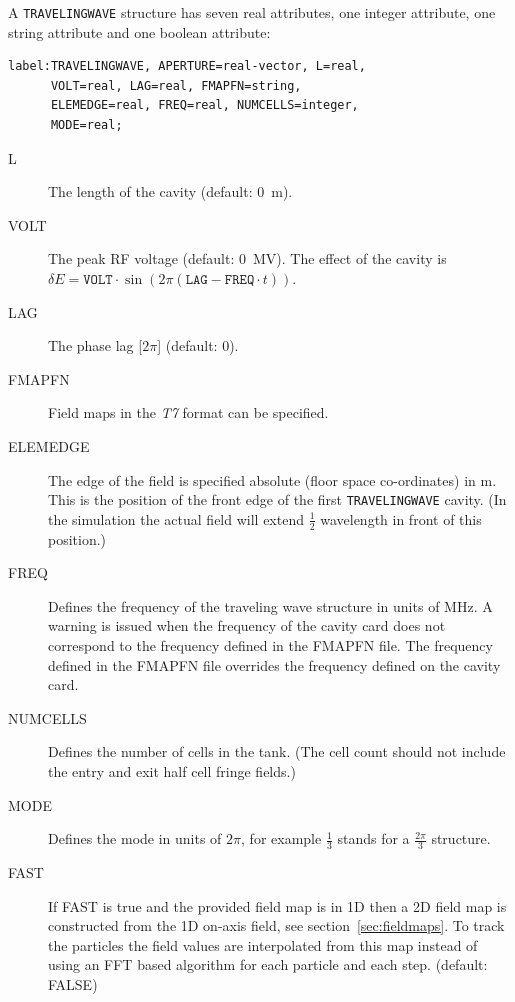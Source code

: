 A \texttt{TRAVELINGWAVE} structure has seven real attributes, one integer attribute, one string attribute and one boolean attribute:
\begin{verbatim}
label:TRAVELINGWAVE, APERTURE=real-vector, L=real,
      VOLT=real, LAG=real, FMAPFN=string,
      ELEMEDGE=real, FREQ=real, NUMCELLS=integer,
      MODE=real;
\end{verbatim}

\begin{description}
\item[L]
  The length of the cavity (default: 0~m).
\item[VOLT]
  The peak RF voltage (default: 0~MV).
  The effect of the cavity is
  $\delta E=\mathtt{VOLT}\cdot\sin(2\pi(\mathtt{LAG}- \mathtt{FREQ}\cdot t))$.
\item[LAG]
  The phase lag [$2\pi$] (default: 0).
\item[FMAPFN]
  Field maps in the {\em T7} format can be specified.
\item[ELEMEDGE]
  The edge of the field is specified absolute (floor space co-ordinates) in m. This is the position of the front edge
  of the first \texttt{TRAVELINGWAVE} cavity. (In the simulation the actual field will extend $\frac{1}{2}$ wavelength
  in front of this position.)
\item[FREQ]
  Defines the frequency of the traveling wave structure in units of MHz. A warning is issued when the frequency of
  the cavity card does not correspond to the frequency defined in the  FMAPFN file. The frequency defined in the FMAPFN
  file overrides the frequency defined on the cavity card. 
\item[NUMCELLS]
  Defines the number of cells in the tank. (The cell count should not include the entry and exit half cell fringe fields.)
\item[MODE]
Defines the mode in units of $2\pi$, for example $\frac{1}{3}$ stands for a $\frac{2 \pi}{3}$ structure.
\item[FAST]
If FAST is true and the provided field map is in 1D then a 2D field map is constructed from the 1D on-axis field, see section~\ref{sec:fieldmaps}. To track the particles the field values are interpolated from this map instead of using an FFT based algorithm for each particle and each step. (default: FALSE)
\end{description}

